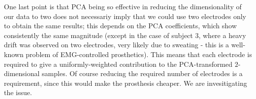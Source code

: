 One last point is that PCA being so effective in reducing the
dimensionality of our data to two does not necessariy imply that we
could use two electrodes only to obtain the same results; this depends
on the PCA coefficients, which show consistently the same magnitude
(except in the case of subject $3$, where a heavy drift was observed
on two electrodes, very likely due to sweating - this is a well-known
problem of EMG-controlled prosthetics). This means that each electrode
is required to give a uniformly-weighted contribution to the
PCA-transformed $2$-dimensional samples. Of course reducing the
required number of electrodes is a requirement, since this would make
the prosthesis cheaper. We are invesitigating the issue.
